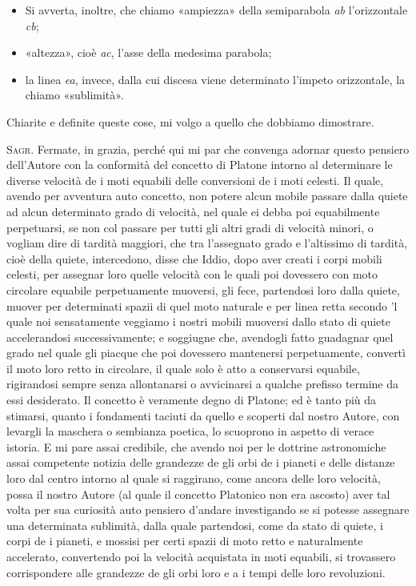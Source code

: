 \documentclass[11pt,twoside,openany]{book}
\newcommand{\speaker}[1]{\textcolor{rubric}{\textsc{#1}}\space}
\begin{document}
\begin{itemize}
\item Si avverta, inoltre, che chiamo «ampiezza» della semiparabola \emph{ab} l'orizzontale \emph{cb};
\item «altezza», cioè \emph{ac}, l'asse della medesima parabola;
\item la linea \emph{ea}, invece, dalla cui discesa viene determinato l'impeto orizzontale, la chiamo «sublimità».
\end{itemize}

Chiarite e definite queste cose, mi volgo a quello che dobbiamo dimostrare.

\speaker{Sagr.} Fermate, in grazia, perché qui mi par che convenga adornar questo pensiero dell'Autore con la conformità del concetto di Platone intorno al determinare le diverse velocità de i moti equabili delle conversioni de i moti celesti. Il quale, avendo per avventura auto concetto, non potere alcun mobile passare dalla quiete ad alcun determinato grado di velocità, nel quale ei debba poi equabilmente perpetuarsi, se non col passare per tutti gli altri gradi di velocità minori, o vogliam dire di tardità maggiori, che tra l'assegnato grado e l'altissimo di tardità, cioè della quiete, intercedono, disse che Iddio, dopo aver creati i corpi mobili celesti, per assegnar loro quelle velocità con le quali poi dovessero con moto circolare equabile perpetuamente muoversi, gli fece, partendosi loro dalla quiete, muover per determinati spazii di quel moto naturale e per linea retta secondo 'l quale noi sensatamente veggiamo i nostri mobili muoversi dallo stato di quiete accelerandosi successivamente; e soggiugne che, avendogli fatto guadagnar quel grado nel quale gli piacque che poi dovessero mantenersi perpetuamente, convertì il moto loro retto in circolare, il quale solo è atto a conservarsi equabile, rigirandosi sempre senza allontanarsi o avvicinarsi a qualche prefisso termine da essi desiderato. Il concetto è veramente degno di Platone; ed è tanto più da stimarsi, quanto i fondamenti taciuti da quello e scoperti dal nostro Autore, con levargli la maschera o sembianza poetica, lo scuoprono in aspetto di verace istoria. E mi pare assai credibile, che avendo noi per le dottrine astronomiche assai competente notizia delle grandezze de gli orbi de i pianeti e delle distanze loro dal centro intorno al quale si raggirano, come ancora delle loro velocità, possa il nostro Autore (al quale il concetto Platonico non era ascosto) aver tal volta per sua curiosità auto pensiero d'andare investigando se si potesse assegnare una determinata sublimità, dalla quale partendosi, come da stato di quiete, i corpi de i pianeti, e mossisi per certi spazii di moto retto e naturalmente accelerato, convertendo poi la velocità acquistata in moti equabili, si trovassero corrispondere alle grandezze de gli orbi loro e a i tempi delle loro revoluzioni.
\end{document}

